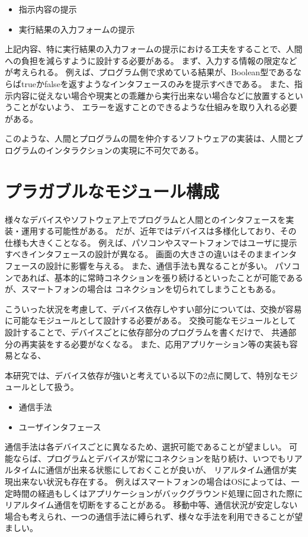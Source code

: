 \begin{itemize}
\itemsep1pt\parskip0pt
\item
  指示内容の提示
\item
  実行結果の入力フォームの提示
\end{itemize}

上記内容、特に実行結果の入力フォームの提示における工夫をすることで、人間への負担を減らすように設計する必要がある。
まず、入力する情報の限定などが考えられる。
例えば、プログラム側で求めている結果が、Boolean型であるならばtrueかfalseを返すようなインタフェースのみを提示すべきである。
また、指示内容に従えない場合や現実との乖離から実行出来ない場合などに放置するということがないよう、
エラーを返すことのできるような仕組みを取り入れる必要がある。

このような、人間とプログラムの間を仲介するソフトウェアの実装は、人間とプログラムのインタラクションの実現に不可欠である。

\section{プラガブルなモジュール構成}\label{sec:plaggable-module-design}

様々なデバイスやソフトウェア上でプログラムと人間とのインタフェースを実装・運用する可能性がある。
だが、近年ではデバイスは多様化しており、その仕様も大きくことなる。
例えば、パソコンやスマートフォンではユーザに提示すべきインタフェースの設計が異なる。
画面の大きさの違いはそのままインタフェースの設計に影響を与える。
また、通信手法も異なることが多い。
パソコンであれば、基本的に常時コネクションを張り続けるといったことが可能であるが、スマートフォンの場合は
コネクションを切られてしまうこともある。

こういった状況を考慮して、デバイス依存しやすい部分については、交換が容易に可能なモジュールとして設計する必要がある。
交換可能なモジュールとして設計することで、デバイスごとに依存部分のプログラムを書くだけで、
共通部分の再実装をする必要がなくなる。
また、応用アプリケーション等の実装も容易となる、

本研究では、デバイス依存が強いと考えている以下の2点に関して、特別なモジュールとして扱う。

\begin{itemize}
\itemsep1pt\parskip0pt
\item
  通信手法
\item
  ユーザインタフェース
\end{itemize}

通信手法は各デバイスごとに異なるため、選択可能であることが望ましい。
可能ならば、プログラムとデバイスが常にコネクションを貼り続け、いつでもリアルタイムに通信が出来る状態にしておくことが良いが、
リアルタイム通信が実現出来ない状況も存在する。
例えばスマートフォンの場合はOSによっては、一定時間の経過もしくはアプリケーションがバックグラウンド処理に回された際に
リアルタイム通信を切断をすることがある。
移動中等、通信状況が安定しない場合も考えられ、一つの通信手法に縛られず、様々な手法を利用できることが望ましい。

